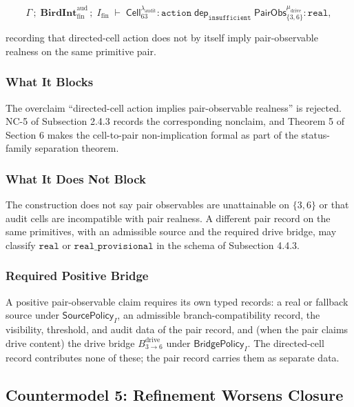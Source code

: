 \documentclass[11pt]{article}
\theoremstyle{definition}
\begin{document}
\[
\Gamma\,;\;\mathbf{BirdInt}^{\mathrm{aud}}_{\mathrm{fin}}\,;\;I_{\mathrm{fin}}\;\vdash\;\mathsf{Cell}_{63}^{\lambda_{\mathrm{audit}}}:\texttt{action}\;\mathrel{\mathsf{dep}_{\texttt{insufficient}}}\;\mathsf{PairObs}_{\{3,6\}}^{\mu_{\mathrm{drive}}}:\texttt{real},
\]

recording that directed-cell action does not by itself imply pair-observable realness on the same primitive pair.

\subsubsection{What It Blocks}

The overclaim ``directed-cell action implies pair-observable realness'' is rejected. NC-5 of Subsection 2.4.3 records the corresponding nonclaim, and Theorem 5 of Section 6 makes the cell-to-pair non-implication formal as part of the status-family separation theorem.

\subsubsection{What It Does Not Block}

The construction does not say pair observables are unattainable on \(\{3,6\}\) or that audit cells are incompatible with pair realness. A different pair record on the same primitives, with an admissible source and the required drive bridge, may classify \(\texttt{real}\) or \(\texttt{real\_provisional}\) in the schema of Subsection 4.4.3.

\subsubsection{Required Positive Bridge}

A positive pair-observable claim requires its own typed records: a real or fallback source under \(\mathsf{SourcePolicy}_I\), an admissible branch-compatibility record, the visibility, threshold, and audit data of the pair record, and (when the pair claims drive content) the drive bridge \(B_{3\to 6}^{\mathrm{drive}}\) under \(\mathsf{BridgePolicy}_I\). The directed-cell record contributes none of these; the pair record carries them as separate data.

\subsection{Countermodel 5: Refinement Worsens Closure}
\end{document}
